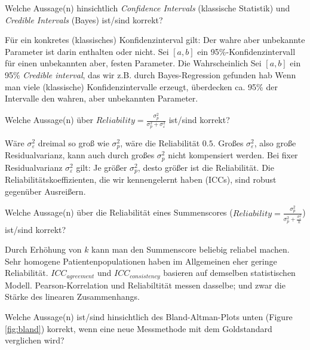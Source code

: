 \documentclass[10pt,addpoints]{exam}
\begin{document}
\begin{questions}
\question Welche Aussage(n) hinsichtlich \textit{Confidence Intervals} (klassische Statistik) und \textit{Credible Intervals} (Bayes) ist/sind korrekt?
\begin{choices}
\CorrectChoice Für ein konkretes (klassisches) Konfidenzinterval gilt: Der wahre aber unbekannte Parameter ist darin enthalten oder nicht.
\choice Sei $[a,b]$ ein 95\%-Konfidenzintervall für einen unbekannten aber, festen Parameter. Die Wahrscheinlich
\CorrectChoice Sei $[a,b]$ ein 95\% \textit{Credible interval}, das wir z.B. durch Bayes-Regression gefunden hab
\CorrectChoice Wenn man viele (klassische) Konfidenzintervalle erzeugt, überdecken ca. 95\% der Intervalle den wahren, aber unbekannten Parameter.
\end{choices}

\question Welche Aussage(n) über $\textit{Reliability}=\frac{\sigma^2_p}{\sigma^2_p + \sigma^2_\varepsilon}$ ist/sind korrekt?
 
\begin{choices}
\choice Wäre $\sigma^2_\varepsilon$ dreimal so groß wie $\sigma^2_p$, wäre die Reliabilität $0.5$.
\choice Großes $\sigma^2_\varepsilon$, also große Residualvarianz, kann auch durch großes $\sigma^2_p$ nicht kompensiert werden.
\CorrectChoice Bei fixer Residualvarianz $\sigma^2_\varepsilon$ gilt: Je größer $\sigma^2_p$, desto größer ist die Reliabilität.
\choice Die Reliabilitätskoeffizienten, die wir kennengelernt haben (ICCs), sind robust gegenüber Ausreißern.
\end{choices}


\question Welche Aussage(n) über die Reliabilität eines Summenscores ($\textit{Reliability}=\frac{\sigma^2_p}{\sigma^2_p + \frac{\sigma^2_\varepsilon}{k}}$) ist/sind korrekt?

\begin{choices}
\CorrectChoice Durch Erhöhung von $k$ kann man den Summenscore beliebig reliabel machen.
\CorrectChoice Sehr homogene Patientenpopulationen haben im Allgemeinen eher geringe Reliabilität.
\CorrectChoice $ICC_{agreement}$ und $ICC_{consistency}$ basieren auf demselben statistischen Modell.
\choice Pearson-Korrelation und Reliabiltität messen dasselbe; und zwar die Stärke des linearen Zusammenhangs.
\end{choices}

\question Welche Aussage(n) ist/sind hinsichtlich des Bland-Altman-Plots unten (Figure \ref{fig:bland}) korrekt, wenn eine neue Messmethode mit dem Goldstandard verglichen wird?


\end{questions}
\end{document}
